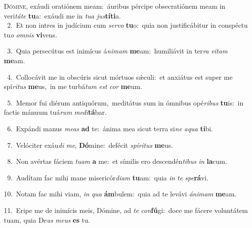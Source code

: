 \lettrine{\initial\textcolor{\initialcolor}{D}}{ómine,} exáudi oratiónem meam:~\dagger áuribus pércipe obsecratiónem meam in veri\-\textit{tá}\-\textit{te} \textbf{tu}\-a:~\star exáudi me in \textit{tu}\-\textit{a} \textit{jus}\-\textbf{tí}\textbf{ti}a.\\
{\numbfont\textcolor{\numbcolor}{~2.}}~Et non intres in judícium cum \textit{ser}\-\textit{vo} \textbf{tu}\-o:~\star quia non justificábitur in conspéctu tu\textit{o} \textit{om}\-\textit{nis} \textbf{vi}\-vens.\par
{\numbfont\textcolor{\numbcolor}{~3.}}~Quia persecútus est inimícus á\-\textit{ni}\-\textit{mam} \textbf{me}\-am:~\star humiliávit in ter\textit{ra} \textit{vi}\-\textit{tam} \textbf{me}\-am.\par
{\numbfont\textcolor{\numbcolor}{~4.}}~Collocávit me in obscúris sicut mórtuos sǽculi:~\dagger et anxiátus est super me spí\-\textit{ri}\-\textit{tus} \textbf{me}\-us,~\star in me turbá\textit{tum} \textit{est} \textit{cor} \textbf{me}\-um.\par
{\numbfont\textcolor{\numbcolor}{~5.}}~Memor fui diérum antiquórum,~\dagger meditátus sum in ómnibus opé\-\textit{ri}\-\textit{bus} \textbf{tu}\-is:~\star in factis mánuum tuá\textit{rum} \textit{me}\-\textit{di}\textbf{tá}bar.\par
{\numbfont\textcolor{\numbcolor}{~6.}}~Expándi manus \textit{me}\-\textit{as} \textbf{ad} te:~\star ánima mea sicut terra si\textit{ne} \textit{a}\-\textit{qua} \textbf{ti}\-bi.\par
{\numbfont\textcolor{\numbcolor}{~7.}}~Velóciter exáu\textit{di} \textit{me}\-, \textbf{Dó}\-mine:~\star defécit \textit{spí}\-\textit{ri}\textit{tus} \textbf{me}\-us.\par
{\numbfont\textcolor{\numbcolor}{~8.}}~Non avértas fáciem \textit{tu}\-\textit{am} \textbf{a} me:~\star et símilis ero descendén\-\textit{ti}\-\textit{bus} \textit{in} \textbf{la}\-cum.\par
{\numbfont\textcolor{\numbcolor}{~9.}}~Audítam fac mihi mane misericór\-\textit{di}\-\textit{am} \textbf{tu}\-am:~\star quia \textit{in} \textit{te} \textit{spe}\-\textbf{rá}vi.\par
{\numbfont\textcolor{\numbcolor}{10.}}~Notam fac mihi viam, \textit{in} \textit{qua} \textbf{ám}\-bulem:~\star quia ad te levávi \textit{á}\-\textit{ni}\textit{mam} \textbf{me}\-am.\par
{\numbfont\textcolor{\numbcolor}{11.}}~Eripe me de inimícis meis, Dómine, ad \textit{te} \textit{con}\-\textbf{fú}gi:~\star doce me fácere voluntátem tuam, quia De\textit{us} \textit{me}\-\textit{us} \textbf{es} tu.\par
